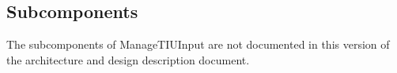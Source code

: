 \subsection{Subcomponents}\label{s:manageTIUInput_subcomponents}

The subcomponents of ManageTIUInput are not documented in this version of the architecture and design description document.
%

%